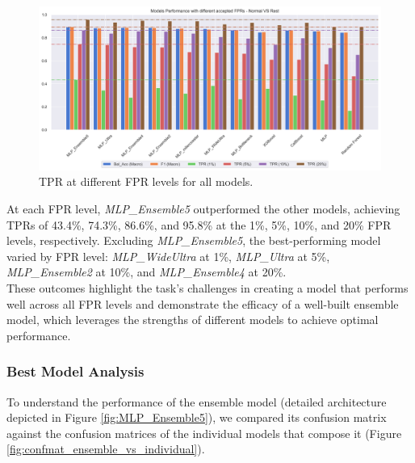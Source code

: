 \begin{figure}[htpb]
    \centering
    \includegraphics[width=.9\textwidth]{./images/nomrVSrest_all.png}
    \caption{TPR at different FPR levels for all models.}
    \label{fig:normVSrest_all}
\end{figure}
\noindent
At each FPR level, \textit{MLP\_Ensemble5} outperformed the other models, 
achieving TPRs of 43.4\%, 74.3\%, 86.6\%, and 95.8\% at the 1\%, 5\%, 10\%, and 20\% FPR levels, 
respectively. Excluding \textit{MLP\_Ensemble5}, the best-performing model varied by 
FPR level: \textit{MLP\_WideUltra} at 1\%, \textit{MLP\_Ultra} at 5\%, \textit{MLP\_Ensemble2} at 10\%, 
and \textit{MLP\_Ensemble4} at 20\%.\\
These outcomes highlight the task's challenges in creating a model that performs well across all FPR 
levels and demonstrate the efficacy of a well-built ensemble model, which leverages the strengths of 
different models to achieve optimal performance.

\subsubsection*{Best Model Analysis}

To understand the performance of the ensemble model (detailed architecture depicted in Figure \ref{fig:MLP_Ensemble5}),
 we compared its confusion matrix against 
the confusion matrices of the individual models that compose it
(Figure \ref{fig:confmat_ensemble_vs_individual}).

